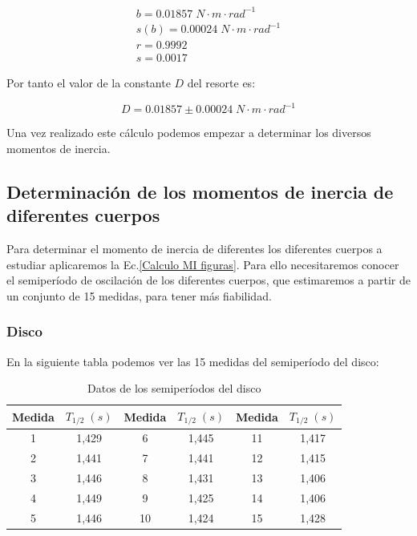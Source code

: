 \documentclass[a4paper,12pt,titlepage]{report}
\begin{document}
\begin{equation}
    \begin{gathered}
        b = 0.01857 \; N\cdot m \cdot rad^{-1}\\
        s(b) =  0.00024 \; N\cdot m \cdot rad^{-1}\\
        r =  0.9992 \\
        s =  0.0017
    \end{gathered}
\end{equation}

Por tanto el valor de la constante $D$ del resorte es:

\begin{equation}
    D = 0.01857 \pm 0.00024 \; N\cdot m \cdot rad^{-1}
\end{equation}

Una vez realizado este cálculo podemos empezar a determinar los diversos momentos de inercia.

\subsection{Determinación de los momentos de inercia de diferentes cuerpos}

Para determinar el momento de inercia de diferentes los diferentes cuerpos a estudiar aplicaremos la Ec.\ref{Calculo MI figuras}. Para ello necesitaremos conocer el semiperíodo de oscilación de los diferentes cuerpos, que estimaremos a partir de un conjunto de 15 medidas, para tener más fiabilidad.

\subsubsection{Disco}

En la siguiente tabla podemos ver las 15 medidas del semiperíodo del disco:

\begin{table}[h!]
    \centering
    \begin{tabular}{|c|c|c|c|c|c|}
    \hline
    Medida  &  $T_{1/2} \; (s)$ & Medida   &   $T_{1/2} \; (s)$    & Medida   &   $T_{1/2} \; (s)$    \\ \hline
    1 & 1,429 & 6  & 1,445 & 11 & 1,417 \\ \hline
    2 & 1,441 & 7  & 1,441 & 12 & 1,415 \\ \hline
    3 & 1,446 & 8  & 1,431 & 13 & 1,406 \\ \hline
    4 & 1,449 & 9  & 1,425 & 14 & 1,406 \\ \hline
    5 & 1,446 & 10 & 1,424 & 15 & 1,428 \\ \hline
    \end{tabular}
    \caption{Datos de los semiperíodos del disco}
    \label{SemiT disco}
\end{table}
\end{document}
